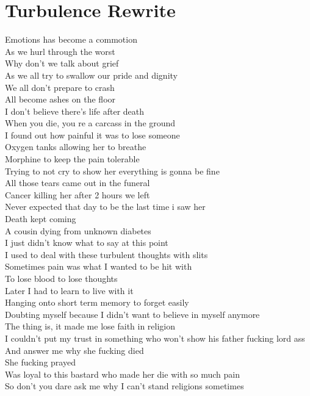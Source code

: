 \documentclass[12pt, b5paper]{article}
\begin{document}
\section{Turbulence Rewrite}
Emotions has become a commotion
\\As we hurl through the worst
\\Why don't we talk about grief
\\As we all try to swallow our pride and dignity
\\We all don't prepare to crash
\\All become ashes on the floor
\\I don't believe there's life after death
\\When you die, you re a carcass in the ground
\\I found out how painful it was to lose someone
\\Oxygen tanks allowing her to breathe
\\Morphine to keep the pain tolerable
\\Trying to not cry to show her everything is gonna be fine
\\All those tears came out in the funeral
\\Cancer killing her after 2 hours we left
\\Never expected that day to be the last time i saw her
\\Death kept coming
\\A cousin dying from unknown diabetes
\\I just didn't know what to say at this point
\\I used to deal with these turbulent thoughts with slits
\\Sometimes pain was what I wanted to be hit with
\\To lose blood to lose thoughts
\\Later I had to learn to live with it
\\Hanging onto short term memory to forget easily
\\Doubting myself because I didn't want to believe in myself anymore
\\The thing is, it made me lose faith in religion
\\I couldn't put my trust in something who won't show his father fucking lord ass
\\And answer me why she fucking died
\\She fucking prayed 
\\Was loyal to this bastard who made her die with so much pain
\\So don't you dare ask me why I can't stand religions sometimes
\end{document}

